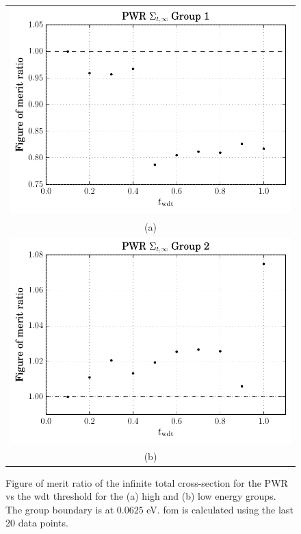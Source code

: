 \begin{figure}[hbtp]
  \centering
  \begin{tabular}{c}
  \includegraphics[scale=0.9]{images/results/pwr_inf_tot_grp_1} \\
    (a) \\
  \includegraphics[scale=0.9]{images/results/pwr_inf_tot_grp_2} \\
    (b) 
  \end{tabular}
  \caption[Figure of merit ratio of the infinite total cross-section for the
  PWR]{Figure of merit ratio of the infinite total cross-section for the PWR vs the
    \gls{wdt} threshold for the (a) high and (b) low energy
    groups. The group boundary is at $0.0625$ eV. \gls{fom} is
    calculated using the last 20 data points.}
  \label{fig:pwr_inf_tot}
\end{figure}

